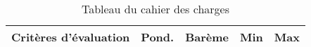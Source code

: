
\begin{table}[htp]
	\caption{Tableau du cahier des charges}
	\label{t:cdc_tab}
	\centering
	\begin{tabular}{|l|c|c|c|c|}
		\hline\hline
		Critères d’évaluation & Pond. & Barème & Min & Max\\
		\hline\hline
	\end{tabular}
	
\end{table}